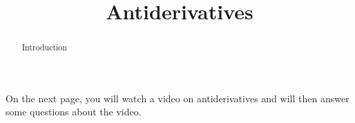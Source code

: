 \documentclass[handout]{ximera}
\title{Antiderivatives}
\begin{document}
\begin{abstract} Introduction %
\end{abstract}

\maketitle

On the next page, you will watch a video on antiderivatives and will then answer some questions about the video.
\end{document}
